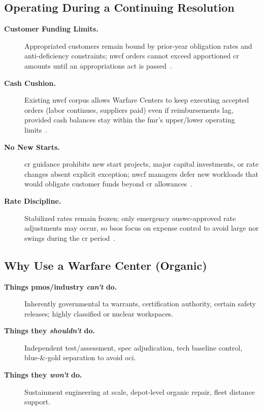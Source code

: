 \documentclass[../main.tex]{subfiles}
\begin{document}
\subsection{Operating During a Continuing Resolution}
\begin{description}
  \item[\textbf{Customer Funding Limits.}] Appropriated customers remain bound by prior-year obligation rates and anti-deficiency constraints; \ac{nwcf} orders cannot exceed apportioned \ac{cr} amounts until an appropriations act is passed~\autocite{CRS-CR}.
  \item[\textbf{Cash Cushion.}] Existing \ac{nwcf} corpus allows Warfare Centers to keep executing accepted orders (labor continues, suppliers paid) even if reimbursements lag, provided cash balances stay within the \ac{fmr}'s upper/lower operating limits~\autocite{DoDFMR-Vol3-Ch19}.
  \item[\textbf{No New Starts.}] \ac{cr} guidance prohibits new start projects, major capital investments, or rate changes absent explicit exception; \ac{nwcf} managers defer new workloads that would obligate customer funds beyond \ac{cr} allowances~\autocite{CRS-CR}.
  \item[\textbf{Rate Discipline.}] Stabilized rates remain frozen; only emergency \ac{ouswc}-approved rate adjustments may occur, so \acp{bso} focus on expense control to avoid large \ac{nor} swings during the \ac{cr} period~\autocite{DoDFMR-Vol3-Ch19}.
\end{description}

\subsection{Why Use a Warfare Center (Organic)}
\begin{description}
  \item[\textbf{Things \acp{pmo}/industry \emph{can't} do.}] Inherently governmental \ac{ta} warrants, certification authority, certain safety releases; highly classified or nuclear workspaces.
  \item[\textbf{Things they \emph{shouldn't} do.}] Independent test/assessment, spec adjudication, tech baseline control, blue-\&-gold separation to avoid \ac{oci}.
  \item[\textbf{Things they \emph{won't} do.}] Sustainment engineering at scale, depot-level organic repair, fleet distance support.
\end{description}
\end{document}
